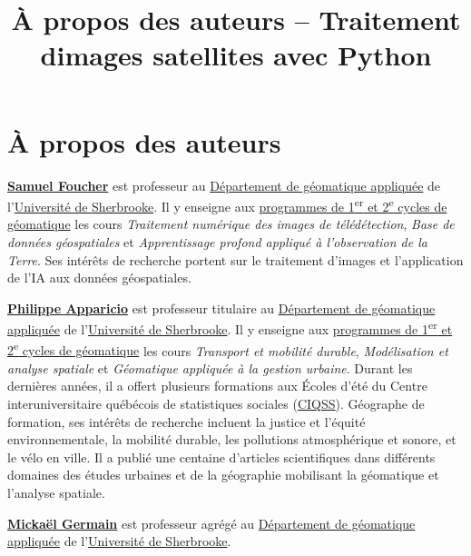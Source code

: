 \documentclass[
]{article}
\title{À propos des auteurs -- Traitement d\textquotesingle images
satellites avec Python}
\author{}
\date{}
\begin{document}
\maketitle

\label{quarto-document-content}
\label{title-block-header}
\section{\texorpdfstring{\protect\hypertarget{auteurs}{}{À propos des
auteurs}}{À propos des auteurs}}\label{uxe0-propos-des-auteurs}

\href{https://www.usherbrooke.ca/recherche/fr/specialistes/details/samuel.foucher}{\textbf{Samuel
Foucher}} est professeur au
\href{https://www.usherbrooke.ca/geomatique/}{Département de géomatique
appliquée} de l'\href{https://www.usherbrooke.ca/}{Université de
Sherbrooke}. Il y enseigne aux
\href{https://www.usherbrooke.ca/geomatique/etudes/programmes}{programmes
de 1\textsuperscript{er} et 2\textsuperscript{e} cycles de géomatique}
les cours \emph{Traitement numérique des images de télédétection},
\emph{Base de données géospatiales} et \emph{Apprentissage profond
appliqué à l'observation de la Terre}. Ses intérêts de recherche portent
sur le traitement d'images et l'application de l'IA aux données
géospatiales.

\href{https://www.usherbrooke.ca/recherche/fr/specialistes/details/philippe.apparicio}{\textbf{Philippe
Apparicio}} est professeur titulaire au
\href{https://www.usherbrooke.ca/geomatique/}{Département de géomatique
appliquée} de l'\href{https://www.usherbrooke.ca/}{Université de
Sherbrooke}. Il y enseigne aux
\href{https://www.usherbrooke.ca/geomatique/etudes/programmes}{programmes
de 1\textsuperscript{er} et 2\textsuperscript{e} cycles de géomatique}
les cours \emph{Transport et mobilité durable}, \emph{Modélisation et
analyse spatiale} et \emph{Géomatique appliquée à la gestion urbaine}.
Durant les dernières années, il a offert plusieurs formations aux Écoles
d'été du Centre interuniversitaire québécois de statistiques sociales
(\href{https://www.ciqss.org/}{CIQSS}). Géographe de formation, ses
intérêts de recherche incluent la justice et l'équité environnementale,
la mobilité durable, les pollutions atmosphérique et sonore, et le vélo
en ville. Il a publié une centaine d'articles scientifiques dans
différents domaines des études urbaines et de la géographie mobilisant
la géomatique et l'analyse spatiale.

\href{https://www.usherbrooke.ca/geomatique/departement/personnel/personnel-enseignant/mickael-germain}{\textbf{Mickaël
Germain}} est professeur agrégé au
\href{https://www.usherbrooke.ca/geomatique/}{Département de géomatique
appliquée} de l'\href{https://www.usherbrooke.ca/}{Université de
Sherbrooke}.
\end{document}
